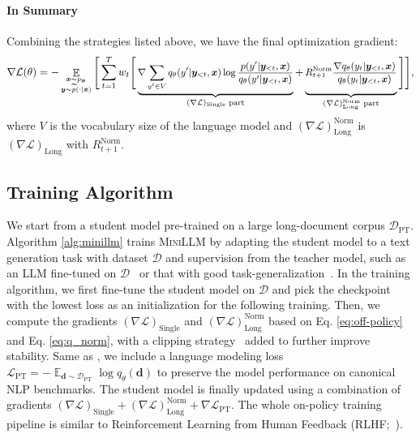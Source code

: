 \documentclass{article}
\def\expct{\mathop{\mathbb{E}}}
\def\pst{q_{\theta}(y_t | \by_{<t}, \bx)}
\def\bx{\bm{x}}
\def\by{\bm{y}}
\begin{document}
\paragraph{In Summary}
Combining the strategies listed above, we have the final optimization gradient:
\begin{equation}
\delimiterfactor=1500
\delimitershortfall=20pt
    \small
    \nabla \mathcal{L}(\theta) = -\expct_{\substack{\bx \sim p_{\bx} \\ \by \sim \widetilde{p}(\cdot | \bx)}} \Big[ \sum_{t=1}^T w_t\Big[ \underbrace{\nabla \sum_{y' \in V} q_\theta (y'|\by_{<t}, \bx) \log \frac{p (y'|\by_{<t}, \bx)}{q_\theta (y'|\by_{<t}, \bx)}}_{(\nabla \mathcal{L})_{\text{Single}} \text{ part}} + \underbrace{ \vphantom{ \sum_{y' \in V} } R_{t+1}^{\text{Norm}} \frac{\nabla \pst}{\pst}}_{ (\nabla \mathcal{L})_{\text{Long}}^{\text{Norm}} \text{ part}}\Big]\Big],
\end{equation}
where $V$ is the vocabulary size of the language model and $(\nabla \mathcal{L})_{\text{Long}}^{\text{Norm}}$ is $(\nabla \mathcal{L})_{\text{Long}}$ with $R^{\text{Norm}}_{t+1}$.


\subsection{Training Algorithm}
\label{sec:alg}
We start from a student model pre-trained on a large long-document corpus $\mathcal{D}_{\text{PT}}$. Algorithm \ref{alg:minillm} trains \textsc{MiniLLM} by adapting the student model to a text generation task with dataset $\mathcal{D}$ and supervision from the teacher model, such as an LLM fine-tuned on $\mathcal{D}$~\citep{alpaca,vicuna} or that with good task-generalization~\citep{flan-t5,gpt4}. In the training algorithm, we first fine-tune the student model on $\mathcal{D}$ and pick the checkpoint with the lowest loss as an initialization for the following training. Then, we compute the gradients $(\nabla \mathcal{L})_{\text{Single}}$ and $(\nabla \mathcal{L})_{\text{Long}}^{\text{Norm}}$ based on Eq. \ref{eq:off-policy} and Eq. \ref{eq:q_norm}, with a clipping strategy~\citep{ppo} added to further improve stability.
Same as \cite{instruct-gpt}, we include a language modeling loss $\mathcal{L}_{\text{PT}} = -\expct_{\bm{d} \sim \mathcal{D}_\text{PT}} \log q_\theta (\bm{d})$ to preserve the model performance on canonical NLP benchmarks. The student model is finally updated using a combination of gradients $(\nabla \mathcal{L})_{\text{Single}} + (\nabla \mathcal{L})_{\text{Long}}^{\text{Norm}} + \nabla \mathcal{L}_\text{PT}$. The whole on-policy training pipeline is similar to Reinforcement Learning from Human Feedback (RLHF;~\citealp{instruct-gpt}). 
\end{document}
